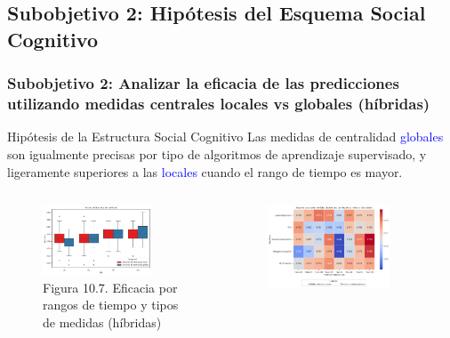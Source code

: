 \documentclass{beamer}
\begin{document}
\subsection{Subobjetivo 2: Hipótesis del Esquema Social Cognitivo}


\begin{frame}
	\frametitle{Subobjetivo 2: Analizar la eficacia de las predicciones utilizando medidas centrales  locales vs globales (híbridas)}
	\begin{block}{Hipótesis de la Estructura Social Cognitivo }
		Las medidas de centralidad \textcolor{blue}{globales} son igualmente precisas por tipo de algoritmos de aprendizaje supervisado, y ligeramente superiores a las \textcolor{blue}{locales} cuando el rango de tiempo es mayor.
	\end{block}
	\begin{columns}[c]
		\begin{column}{.5\textwidth}
			\begin{figure}
				\centering
				\includegraphics[width=0.8\textwidth]{figs/cap7/figura_38}
				\caption{Figura 10.7. Eficacia por rangos de tiempo y tipos de medidas (híbridas)}
			\end{figure}      
		\end{column}
		\begin{column}{.5\textwidth}
			\begin{figure}
				\centering
				\includegraphics[width=0.8\textwidth]{figs/cap7/figura_90}

\end{figure}
\end{column}
\end{columns}
\end{frame}
\end{document}
